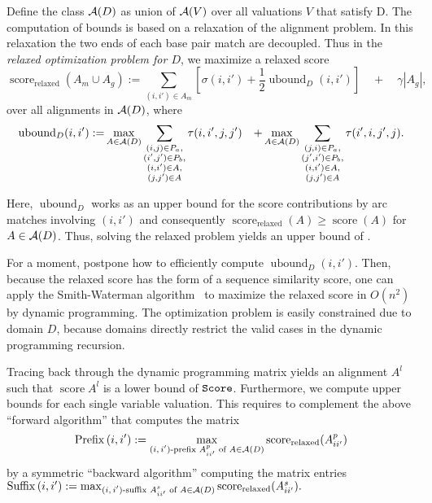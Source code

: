 \documentclass[11pt]{llncs}
\newcommand{\score}{\operatorname{score}}
\begin{document}
Define the class ${\mathcal A}(D)$ as union of ${\mathcal A}(V)$ over all valuations $V$
that satisfy D. The computation of bounds is based on a relaxation of
the alignment problem. In this relaxation the two ends of each base
pair match are decoupled. Thus in the \emph{relaxed optimization
  problem for $D$}, we maximize a relaxed score
\vspace{-6pt}
 \begin{displaymath}
  \score_\text{relaxed}(A_m\cup A_g) :=
  \sum_{(i,i')\in A_m} \left[
  \sigma(i,i') + \frac{1}{2}\operatorname{ubound}_D(i,i') \right]
  \quad + \quad \gamma |A_g|,
\end{displaymath}
\vspace{-8pt}
over all alignments in ${\mathcal A}(D)$, where
\begin{align*}
  \operatorname{ubound}_D(i,i') := & \max_{A\in{\mathcal A}(D)} \sum_{\substack{(i,j)\in P_a,\\(i',j')\in P_b,\\(i,i')\in A,\\(j,j')\in A}} \tau(i,i',j,j')
  & + \max_{A\in{\mathcal A}(D)} \sum_{\substack{(j,i)\in P_a,\\(j',i')\in P_b,\\(i,i')\in A,\\(j,j')\in A}} \tau(i',i,j',j).
\end{align*}

Here, $\operatorname{ubound}_D$ works as an upper bound for the score
contributions by arc matches involving $(i,i')$ and consequently
$\score_\text{relaxed}(A) \geq \score(A)$ for $A\in{\mathcal A}(D)$. Thus,
solving the relaxed problem yields an upper bound of .

For a moment, postpone how to efficiently compute
$\operatorname{ubound}_D(i,i')$. Then, because the relaxed score has
the form of a sequence similarity score, one can apply the
Smith-Waterman algorithm~\cite{smith81:_compar_bioseq} to maximize the
relaxed score in $O(n^2)$ by dynamic programming. The optimization
problem is easily constrained due to domain $D$, because domains
directly restrict the valid cases in the dynamic programming
recursion.

Tracing back through the dynamic programming matrix yields an alignment
$A^l$ such that $\score{A^l}$ is a lower bound of $\texttt{Score}$.
%
Furthermore, we compute upper bounds for each single variable
valuation. This requires to complement the above ``forward algorithm''
that computes the matrix
\vspace{-4pt}
\begin{displaymath}
  \operatorname{Prefix}{(i,i')} := \max_{\text{$(i,i')$-prefix
      $A^p_{ii'}$ of }A\in\cA(D)} \score_\text{relaxed}(A^p_{ii'})\\[-6pt]
\end{displaymath}
by a symmetric ``backward algorithm'' computing the matrix entries
\begin{math}
 \operatorname{Suffix}{(i,i')} :=
  \max_{\text{$(i,i')$-suffix $A^s_{ii'}$ of }A\in\cA(D)}
  \score_\text{relaxed}(A^s_{ii'}).
\end{math}
\end{document}
